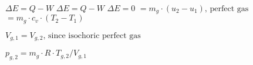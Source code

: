 \( \Delta E = Q - W \)  
\( \Delta E = Q - W \)  
\( \Delta E = 0 \)  
\( = m_{g} \cdot (u_{2} - u_{1}), \, \text{perfect gas} \)  
\( = m_{g} \cdot c_{v} \cdot (T_{2} - T_{1}) \)  

\( V_{g,1} = V_{g,2}, \, \text{since isochoric perfect gas} \)  

\( p_{g,2} = m_{g} \cdot R \cdot T_{g,2} / V_{g,1} \)